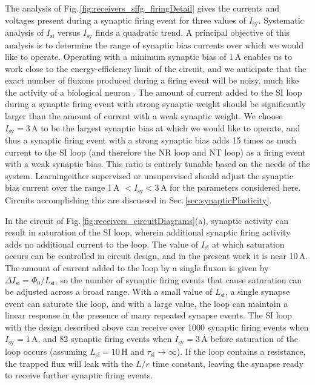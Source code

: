 \documentclass[aip,amsmath,amssymb,reprint,nofootinbib]{revtex4-1}
\begin{document}
The analysis of Fig.\,\ref{fig:receivers_sffg_firingDetail} gives the currents and voltages present during a synaptic firing event for three values of $I_{\mathrm{sy}}$. Systematic analysis of $I_{\mathrm{si}}$ versus $I_{\mathrm{sy}}$ finds a quadratic trend. A principal objective of this analysis is to determine the range of synaptic bias currents over which we would like to operate. Operating with a minimum synaptic bias of 1\,\textmu A enables us to work close to the energy-efficiency limit of the circuit, and we anticipate that the exact number of fluxons produced during a firing event will be noisy, much like the activity of a biological neuron \cite{stgo2005}. The amount of current added to the SI loop during a synaptic firing event with strong synaptic weight should be significantly larger than the amount of current with a weak synaptic weight. We choose $I_{\mathrm{sy}} = 3$\,\textmu A to be the largest synaptic bias at which we would like to operate, and thus a synaptic firing event with a strong synaptic bias adds 15 times as much current to the SI loop (and therefore the NR loop and NT loop) as a firing event with a weak synaptic bias. This ratio is entirely tunable based on the needs of the system. Learning\textemdash either supervised or unsupervised \textemdash should adjust the synaptic bias current over the range 1\,\textmu A $< I_{\mathrm{sy}} < 3$\,\textmu A for the parameters considered here. Circuits accomplishing this are discussed in Sec.\,\ref{sec:synapticPlasticity}.

In the circuit of Fig.\,\ref{fig:receivers_circuitDiagrams}(a), synaptic activity can result in saturation of the SI loop, wherein additional synaptic firing activity adds no additional current to the loop. The value of $I_{\mathrm{si}}$ at which saturation occurs can be controlled in circuit design, and in the present work it is near 10\,\textmu A.  The amount of current added to the loop by a single fluxon is given by $\Delta I_{\mathrm{si}} = \Phi_0/L_{\mathrm{si}}$, so the number of synaptic firing events that cause saturation can be adjusted across a broad range. With a small value of $L_{\mathrm{si}}$, a single synapse event can saturate the loop, and with a large value, the loop can maintain a linear response in the presence of many repeated synapse events. The SI loop with the design described above can receive over 1000 synaptic firing events when $I_{\mathrm{sy}} = 1$\,\textmu A, and 82 synaptic firing events when $I_{\mathrm{sy}} = 3$\,\textmu A before saturation of the loop occurs (assuming $L_{\mathrm{si}} = 10$\,\textmu H and $\tau_{\mathrm{si}}\rightarrow \infty$). If the loop contains a resistance, the trapped flux will leak with the $L/r$ time constant, leaving the synapse ready to receive further synaptic firing events.
\end{document}
